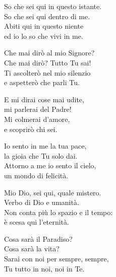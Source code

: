 
\strofa So che sei qui in questo istante.\\
So che sei qui dentro di me.\\
Abiti qui in questo niente\\
ed io lo so che vivi in me.

\spazio

\strofa Che mai dirò al mio Signore?\\
Che mai dirò? Tutto Tu sai!\\
Ti ascolterò nel mio silenzio\\
e aspetterò che parli Tu.

\spazio

\strofa E mi dirai cose mai udite,\\
mi parlerai del Padre!\\
Mi colmerai d'amore,\\
e scoprirò chi sei.

\spazio

\strofa Io sento in me la tua pace,\\ 
la gioia che Tu solo dai.\\
Attorno a me io sento il cielo,\\
un mondo di felicità. 

\spazio

\strofa Mio Dio, sei qui, quale mistero.\\
Verbo di Dio e umanità.\\
Non conta più lo spazio e il tempo:\\
è scesa qui l'eternità.

\spazio

\strofa Cosa sarà il Paradiso?\\
Cosa sarà la vita?\\
Sarai con noi per sempre, sempre,\\ 
Tu tutto in noi, noi in Te. 